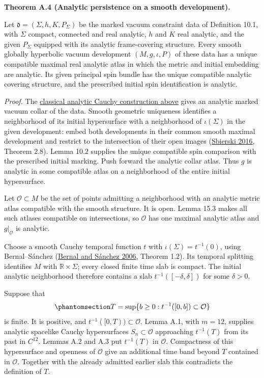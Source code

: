 \documentclass[
  english,
  11pt,
  reqno]{amsart}
\makeatletter
\newcommand{\pandocstatementheading}[1]{%
  \par\if@nobreak\else
    \addpenalty{\@beginparpenalty}%
    \addvspace{.5\baselineskip plus .2\baselineskip minus .2\baselineskip}%
  \fi
  {\normalfont\bfseries #1\par}%
  \nobreak\@afterindenttrue\@afterheading
}
\makeatother
\begin{document}
\pandocstatementheading{\protect{}\label{thm:compact-analytic-vacuum-persistence}Theorem A.4 (Analytic persistence on a smooth development).}

Let \(\mathfrak d=(\Sigma,h,K,P_\Sigma)\) be the marked vacuum
constraint data of Definition 10.1, with \(\Sigma\) compact, connected
and real analytic, \(h\) and \(K\) real analytic, and the given
\(P_\Sigma\) equipped with its analytic frame-covering structure. Every
smooth globally hyperbolic vacuum development \((M,g,\iota,P)\) of these
data has a unique compatible maximal real analytic atlas in which the
metric and initial embedding are analytic. Its given principal spin
bundle has the unique compatible analytic covering structure, and the
prescribed initial spin identification is analytic.

\emph{Proof.} The
\hyperref[sec:classical-analytic-cauchy-collars]{classical analytic
Cauchy construction above} gives an analytic marked vacuum collar of the
data. Smooth geometric uniqueness identifies a neighborhood of its
initial hypersurface with a neighborhood of \(\iota(\Sigma)\) in the
given development: embed both developments in their common smooth
maximal development and restrict to the intersection of their open
images (\hyperref[ref-Sbierski2016]{Sbierski 2016}, Theorem 2.8). Lemma
10.2 supplies the unique compatible spin comparison with the prescribed
initial marking. Push forward the analytic collar atlas. Thus \(g\) is
analytic in some compatible atlas on a neighborhood of the entire
initial hypersurface.

Let \(\mathcal O\subset M\) be the set of points admitting a
neighborhood with an analytic metric atlas compatible with the smooth
structure. It is open. Lemma 15.3 makes all such atlases compatible on
intersections, so \(\mathcal O\) has one maximal analytic atlas and
\(g|_{\mathcal O}\) is analytic.

Choose a smooth Cauchy temporal function \(t\) with
\(\iota(\Sigma)=t^{-1}(0)\), using Bernal--Sánchez
(\hyperref[ref-BernalSanchez2006]{Bernal and Sánchez 2006}, Theorem
1.2). Its temporal splitting identifies \(M\) with
\(\mathbb R\times\Sigma\); every closed finite time slab is compact. The
initial analytic neighborhood therefore contains a slab
\(t^{-1}([-\delta,\delta])\) for some \(\delta>0\).

Suppose that
\begin{equation}\protect\phantomsection\label{eq:analytic-persistence-first-slice}{
T=\sup\{b\ge0:t^{-1}([0,b])\subset\mathcal O\}
}\end{equation} is finite. It is positive, and
\(t^{-1}([0,T))\subset\mathcal O\). Lemma A.1, with \(m=12\), supplies
analytic spacelike Cauchy hypersurfaces \(S_n\subset\mathcal O\)
approaching \(t^{-1}(T)\) from its past in \(C^{12}\). Lemmas A.2 and
A.3 put \(t^{-1}(T)\) in \(\mathcal O\). Compactness of this
hypersurface and openness of \(\mathcal O\) give an additional time band
beyond \(T\) contained in \(\mathcal O\). Together with the already
admitted earlier slab this contradicts the definition of \(T\).
\end{document}
